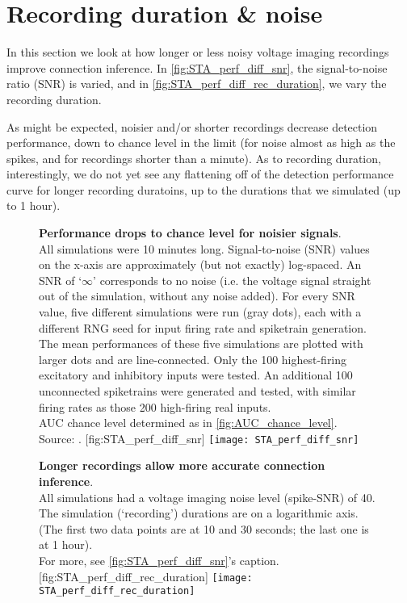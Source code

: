 \section{Recording duration \& noise}

In this section we look at how longer or less noisy voltage imaging recordings improve connection inference. In \cref{fig:STA_perf_diff_snr}, the signal-to-noise ratio (SNR) is varied, and in \cref{fig:STA_perf_diff_rec_duration}, we vary the recording duration.

As might be expected, noisier and/or shorter recordings decrease detection performance, down to chance level in the limit (for noise almost as high as the spikes, and for recordings shorter than a minute). As to recording duration, interestingly, we do not yet see any flattening off of the detection performance curve for longer recording duratoins, up to the durations that we simulated (up to 1 hour).

\begin{figure}
    \begin{sidecaption}
        {\textbf{Performance drops to chance level for noisier signals}.\\
        All simulations were 10 minutes long.
        Signal-to-noise (SNR) values on the x-axis are approximately (but not exactly) log-spaced. An SNR of `$\infty$' corresponds to no noise (i.e. the voltage signal straight out of the simulation, without any noise added).
        For every SNR value, five different simulations were run (gray dots), each with a different RNG seed for input firing rate and spiketrain generation. The mean performances of these five simulations are plotted with larger dots and are line-connected.
        Only the 100 highest-firing excitatory and inhibitory inputs were tested. An additional 100 unconnected spiketrains were generated and tested, with similar firing rates as those 200 high-firing real inputs.\\
        AUC chance level determined as in \cref{fig:AUC_chance_level}.\\
        Source: .}
        [fig:STA_perf_diff_snr]
        \texttt{[image: STA\_perf\_diff\_snr]}
    \end{sidecaption}
\end{figure}

\begin{figure}
    \begin{sidecaption}
        {\textbf{Longer recordings allow more accurate connection inference}.\\
        All simulations had a voltage imaging noise level (spike-SNR) of 40.\\
        The simulation (`recording') durations are on a logarithmic axis. (The first two data points are at 10 and 30 seconds; the last one is at 1 hour). \\
        For more, see \cref{fig:STA_perf_diff_snr}'s caption.}
        [fig:STA_perf_diff_rec_duration]
        \texttt{[image: STA\_perf\_diff\_rec\_duration]}
    \end{sidecaption}
\end{figure}

